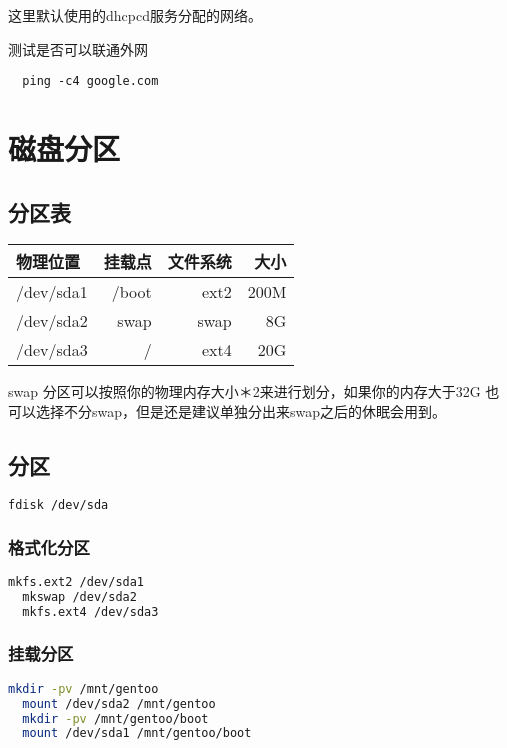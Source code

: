 \documentclass{book}
\begin{document}
这里默认使用的dhcpcd服务分配的网络。

测试是否可以联通外网
\begin{lstlisting}
  ping -c4 google.com
\end{lstlisting}

\chapter{磁盘分区}
\section{分区表}
\begin{tabular}{|l|r|r|r|}
  \hline
  物理位置 & 挂载点 & 文件系统 & 大小 \\
  \hline
  /dev/sda1 & /boot & ext2 & 200M \\
  \hline
  /dev/sda2 & swap & swap & 8G \\
  \hline
  /dev/sda3 & / & ext4 & 20G \\
  \hline
\end{tabular}

swap 分区可以按照你的物理内存大小＊2来进行划分，如果你的内存大于32G 也可以选择不分swap，但是还是建议单独分出来swap之后的休眠会用到。 
\section{分区}

\begin{lstlisting}[language=Bash]
  fdisk /dev/sda
\end{lstlisting}

\subsection{格式化分区}

\begin{lstlisting}[language=Bash]
  mkfs.ext2 /dev/sda1
  mkswap /dev/sda2
  mkfs.ext4 /dev/sda3 
\end{lstlisting}

\subsection{挂载分区}
\begin{lstlisting}[language=Bash]
  mkdir -pv /mnt/gentoo
  mount /dev/sda2 /mnt/gentoo
  mkdir -pv /mnt/gentoo/boot
  mount /dev/sda1 /mnt/gentoo/boot
\end{lstlisting}
\end{document}
